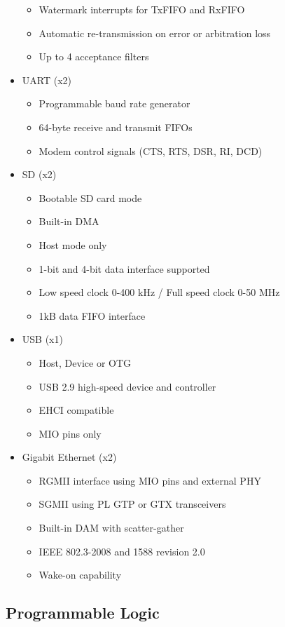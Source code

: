 \begin{itemize}
\begin{itemize}
		\item Watermark interrupts for TxFIFO and RxFIFO
		\item Automatic re-transmission on error or arbitration loss
		\item Up to 4 acceptance filters
	\end{itemize}
	\item UART (x2)
	\begin{itemize}
		\item Programmable baud rate generator
		\item 64-byte receive and transmit FIFOs
		\item Modem control signals (CTS, RTS, DSR, RI, DCD)
	\end{itemize}
	\item SD (x2)
	\begin{itemize}
		\item Bootable SD card mode
		\item Built-in DMA
		\item Host mode only
		\item 1-bit and 4-bit data interface supported
		\item Low speed clock 0-400 kHz / Full speed clock 0-50 MHz
		\item 1kB data FIFO interface
	\end{itemize}
	\item USB (x1)
	\begin{itemize}
		\item Host, Device or OTG
		\item USB 2.9 high-speed device and controller
		\item EHCI compatible
		\item MIO pins only
	\end{itemize}
	\item Gigabit Ethernet (x2)
	\begin{itemize}
		\item RGMII interface using MIO pins and external PHY
		\item SGMII using PL GTP or GTX transceivers
		\item Built-in DAM with scatter-gather
		\item IEEE 802.3-2008 and 1588 revision 2.0
		\item Wake-on capability
	\end{itemize}
\end{itemize}

\subsection{Programmable Logic}

